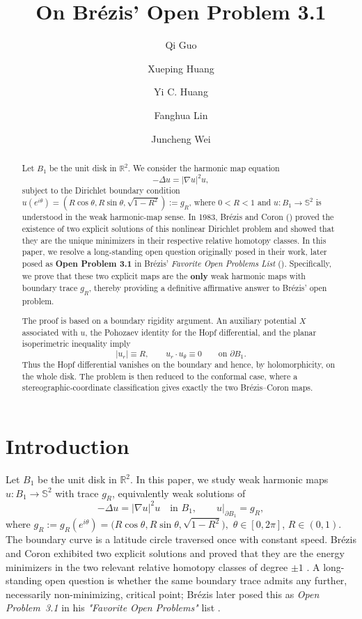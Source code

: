 \documentclass[11pt]{amsart}
\title[Br\'ezis-Coron Uniqueness of Harmonic Maps]{On Br\'ezis' Open Problem 3.1 }
\author[Q. Guo]{Qi Guo}
\author[X. Huang]{Xueping Huang}
\author[Y. C. Huang]{Yi C. Huang}
\author[F. Lin]{Fanghua Lin}
\author[J. Wei]{Juncheng Wei}
\numberwithin{equation}{section}
\theoremstyle{remark}
\newcommand{\Sph}{\mathbb{S}^2}
\begin{document}
\begin{abstract}
Let $B_1$ be the unit disk in ${\mathbb R}^2$. We consider the harmonic map equation
\[
 -\Delta u=|\nabla u|^2u,
 \]
subject to the Dirichlet boundary condition $
 u(e^{i\theta})=(R\cos\theta,R\sin\theta,\sqrt{1-R^2}):=g_R$, where $0<R<1$ and $u\colon B_1\to\mathbb S^2$ is understood in the weak
 harmonic-map sense. In 1983, Br\'ezis and Coron (\cite{BrCo}) proved the existence of two explicit solutions of this nonlinear Dirichlet
 problem and showed that they are the unique minimizers in their respective  relative homotopy classes.
 In this paper, we resolve a long-standing open question originally posed in their work, later posed as {\bf Open Problem 3.1} in Brézis’
 {\em Favorite Open Problems List} (\cite{Brezis2023}). Specifically, we prove that these two explicit maps are the {\bf only} weak harmonic maps with boundary
 trace $g_{R}$, thereby providing a definitive affirmative answer to Brézis' open problem.

The proof is based on a boundary rigidity argument. An auxiliary potential $X$ associated with $u$, the Pohozaev identity for the Hopf
differential, and the planar isoperimetric inequality imply
\[
|u_r|\equiv R,
\qquad
u_r\cdot u_\theta\equiv0
\qquad\text{on }\partial B_1.
\]
Thus the Hopf differential vanishes on the boundary and hence, by holomorphicity, on the whole disk. The problem is then reduced to the
conformal case, where a stereographic-coordinate classification gives exactly the two Br\'ezis--Coron maps.
\end{abstract}

\maketitle
\tableofcontents



\section{Introduction}

Let $B_1$ be the unit disk in $ {\mathbb R}^2$.
In this paper, we study weak harmonic maps $u\colon B_1 \to\Sph$ with trace $g_R$, equivalently weak solutions of
\[
 -\Delta u=|\nabla u|^2u
 \quad\text{in }B_1,
 \qquad
 u|_{\partial B_1}=g_R,
\]
where $g_R:=g_R(e^{i\theta})= \bigl(R\cos\theta,R\sin\theta,\sqrt{1-R^2}\bigr),$ $\theta\in[0,2\pi]$, $R\in (0,1)$.
The boundary curve is a latitude circle traversed once with constant speed. Br\'ezis and Coron exhibited two explicit solutions and proved
that they are the energy minimizers in the two relevant relative homotopy classes of degree $\pm 1$ \cite{BrCo}. A long-standing open question
is whether the same boundary trace admits any further, necessarily non-minimizing, critical point; Br\'ezis later posed this as {\it Open
Problem~3.1} in his {\em "Favorite Open Problems"} list \cite{Brezis2023}.
\end{document}
